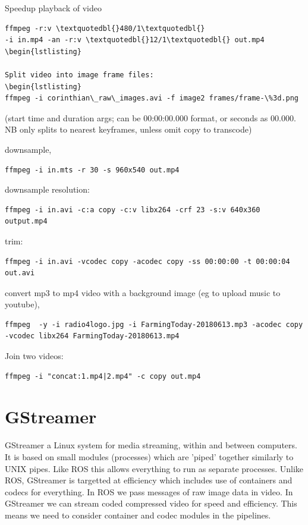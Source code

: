 \documentclass[oneside,english]{scrbook}
\begin{document}
Speedup playback of video 
\begin{lstlisting}
ffmpeg -r:v \textquotedbl{}480/1\textquotedbl{}
-i in.mp4 -an -r:v \textquotedbl{}12/1\textquotedbl{} out.mp4
\begin{lstlisting}

Split video into image frame files: 
\begin{lstlisting}
ffmpeg -i corinthian\_raw\_images.avi -f image2 frames/frame-\%3d.png 
\end{lstlisting}
(start time and duration args; can be 00:00:00.000 format, or seconds as 00.000. NB only splits to nearest keyframes, unless omit copy to transcode)

downsample,
\begin{lstlisting}
ffmpeg -i in.mts -r 30 -s 960x540 out.mp4
\end{lstlisting}

downsample resolution: 
\begin{lstlisting}
ffmpeg -i in.avi -c:a copy -c:v libx264 -crf 23 -s:v 640x360 output.mp4
\end{lstlisting}

trim:
\begin{lstlisting}
ffmpeg -i in.avi -vcodec copy -acodec copy -ss 00:00:00 -t 00:00:04 out.avi
\end{lstlisting}

convert mp3 to mp4 video with a background image (eg to upload music to youtube),
\begin{lstlisting}
ffmpeg  -y -i radio4logo.jpg -i FarmingToday-20180613.mp3 -acodec copy -vcodec libx264 FarmingToday-20180613.mp4
\end{lstlisting}

Join two videos:
\begin{lstlisting}
ffmpeg -i "concat:1.mp4|2.mp4" -c copy out.mp4
\end{lstlisting}



\chapter{GStreamer}

GStreamer a Linux system for media streaming, within and between computers. It is based on small modules (processes) which are 'piped' together similarly to UNIX pipes.  Like ROS this allows everything to run as separate processes. Unlike ROS, GStreamer is targetted at efficiency which includes use of containers and codecs for everything. In ROS we pass messages of raw image data in video. In GStreamer we can stream coded compressed video for speed and efficiency.  This means we need to consider container and codec modules in the pipelines.
\end{document}
